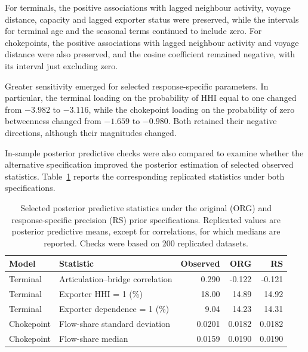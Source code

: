 \documentclass[pdftex,12pt,openright,a4paper,oneside]{book}
\begin{document}
For terminals, the positive associations with lagged
neighbour activity, voyage distance, capacity and
lagged exporter status were preserved, while the
intervals for terminal age and the seasonal terms
continued to include zero.
For chokepoints, the positive associations with
lagged neighbour activity and voyage distance
were also preserved, and the cosine coefficient
remained negative, with its interval just
excluding zero.

Greater sensitivity emerged for selected
response-specific parameters. In particular, the terminal loading
on the probability of HHI equal to one changed
from $-3.982$ to $-3.116$, while the chokepoint
loading on the probability of zero betweenness
changed from $-1.659$ to $-0.980$.
Both retained their negative directions, although
their magnitudes changed.

In-sample posterior predictive checks were also compared
to examine whether the alternative specification
improved the posterior estimation of selected observed statistics.
Table~\ref{tab:prior_sensitivity_ppc}
reports the corresponding replicated statistics
under both specifications.

\begin{table}[htbp]
\centering
\caption{Selected posterior predictive statistics
under the original (ORG) and response-specific
precision (RS) prior specifications.
Replicated values are posterior predictive means,
except for correlations, for which medians are
reported. Checks were based on 200 replicated datasets.}
\label{tab:prior_sensitivity_ppc}

\begin{tabular}{llrrr}
\hline
Model & Statistic & Observed & ORG & RS \\
\hline
Terminal
& Articulation--bridge correlation
& 0.290 & -0.122 & -0.121 \\

Terminal
& Exporter HHI = 1 (\%)
& 18.00 & 14.89 & 14.92 \\

Terminal
& Exporter dependence = 1 (\%)
& 9.04 & 14.23 & 14.31 \\

Chokepoint
& Flow-share standard deviation
& 0.0201 & 0.0182 & 0.0182 \\

Chokepoint
& Flow-share median
& 0.0159 & 0.0190 & 0.0190 \\
\hline
\end{tabular}
\end{table}
\end{document}
